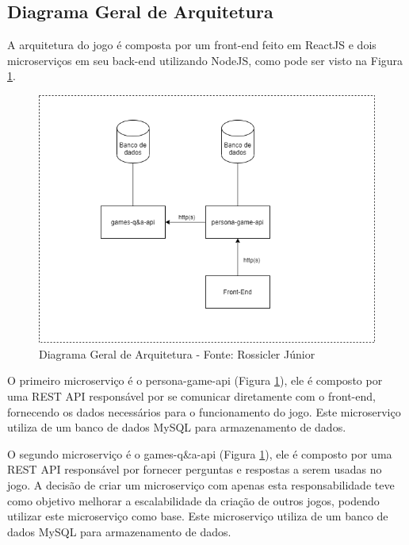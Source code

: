 {\color{textadded}
\subsection{Diagrama Geral de Arquitetura}

A arquitetura do jogo é composta por um front-end feito em ReactJS e dois microserviços em seu back-end utilizando NodeJS, como pode ser visto na Figura \ref{Fig:diagrama_arquitetura.png}.

\begin{figure}[htbp]
	\centering
		\includegraphics[keepaspectratio=true,scale=0.56]{figuras/arquitetura/diagrama_arquitetura.png}
		\caption{Diagrama Geral de Arquitetura - Fonte: Rossicler Júnior}
	\label{Fig:diagrama_arquitetura.png}
\end{figure}

O primeiro microserviço é o persona-game-api (Figura \ref{Fig:diagrama_arquitetura.png}), ele é composto por uma REST API responsável por se comunicar diretamente com o front-end, fornecendo os dados necessários para o funcionamento do jogo. Este microserviço utiliza de um banco de dados MySQL para armazenamento de dados.

O segundo microserviço é o games-q\&a-api (Figura \ref{Fig:diagrama_arquitetura.png}), ele é composto por uma REST API responsável por fornecer perguntas e respostas a serem usadas no jogo. A decisão de criar um microserviço com apenas esta responsabilidade teve como objetivo melhorar a escalabilidade da criação de outros jogos, podendo utilizar este microserviço como base. Este microserviço utiliza de um banco de dados MySQL para armazenamento de dados.

}
